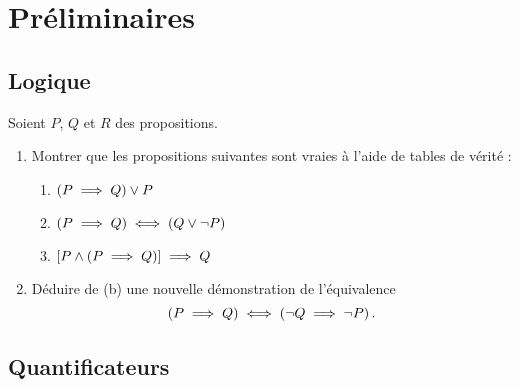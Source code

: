 \chapter{Préliminaires}

\minitoc

\section{Logique}

\begin{exo}[Exercice 1]
Soient \(P\), \(Q\) et \(R\) des propositions.

\begin{enumerate}
\item Montrer que les propositions suivantes sont vraies à l'aide de tables de vérité :

\begin{enumerate}
\item \(\left(P\implies Q\right)\lor P\) \\

\item \(\left(P\implies Q\right)\iff\left(Q\lor\lnot P\right)\) \\

\item \(\left[P\land\left(P\implies Q\right)\right]\implies Q\) \\
\end{enumerate}

\item Déduire de (b) une nouvelle démonstration de l'équivalence \[\left(P\implies Q\right)\iff\left(\lnot Q\implies\lnot P\right).\]
\end{enumerate}
\end{exo}

\begin{corr}
\end{corr}

\section{Quantificateurs}

